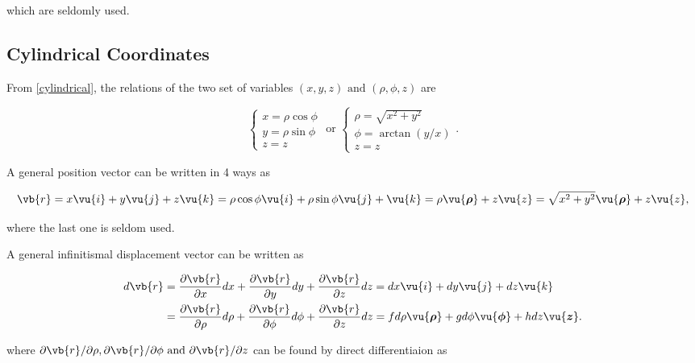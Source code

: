 \documentclass[english,a4paper,12pt]{report}
\begin{document}
which are seldomly used.



	
\subsection{Cylindrical Coordinates}

From \cref{cylindrical}, the relations of the two set of variables \((x,y,z) \text { and } (\rho , \phi , z)\)  are

\begin{equation}
    \begin{cases} x = \rho \cos \phi \\ y = \rho \sin \phi \\ z = z \end{cases} \text { or } \begin{cases} \rho  = \sqrt{x^2+y^2} \\  \phi = \arctan {\left( y /x  \right)} \\ z = z \end{cases}. 
\end{equation}

A general position vector can be written in 4 ways as

\begin{equation}
    \vb{r} = x \vu{i} + y \vu{j} + z \vu{k} = \rho \cos \phi  \vu{i} + \rho \sin \phi \vu{j} + \vu{k} = \rho \vu{\boldsymbol{\rho } } + z \vu{z} = \sqrt{x^2+y^2}\vu{\boldsymbol{\rho } } + z \vu{z} , 
\end{equation}

where the last one is seldom used.

A general infinitismal displacement vector can be written as 

\begin{equation}
    \begin{aligned}
    d \vb{r} &= \frac{\partial \vb{r} }{\partial x} dx + \frac{\partial \vb{r} }{\partial y} dy + \frac{\partial \vb{r} }{\partial z} dz = dx \vu{i} + dy \vu{j} + dz \vu{k} \\ &= \frac{\partial \vb{r} }{\partial \rho } d\rho  + \frac{\partial \vb{r} }{\partial \phi  }d \phi  + \frac{\partial \vb{r} }{\partial z}d z =f d \rho  \vu{\boldsymbol{\rho } }  +g d\phi \vu{\boldsymbol{\phi  } } +h  d z\vu{\boldsymbol{z} }. 
    \end{aligned}
\end{equation}

where \(\partial \vb{r} / \partial \rho , \partial \vb{r} / \partial \phi  \text { and } \partial \vb{r} /\partial z  \) can be found by direct differentiaion as 
\end{document}
